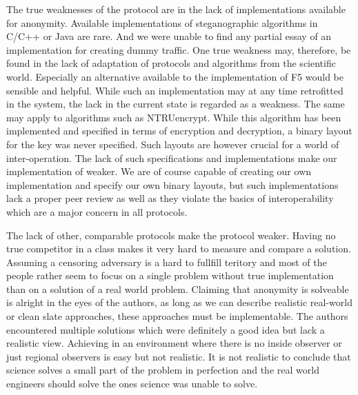 The true weaknesses of the protocol are in the lack of implementations available for anonymity. Available implementations of steganographic algorithms in C/C++ or Java are rare. And we were unable to find any partial essay of an implementation for creating dummy traffic. One true weakness may, therefore, be found in the lack of adaptation of protocols and algorithms from the scientific world. Especially an alternative available to the implementation of F5 would be sensible and helpful. While such an implementation may at any time retrofitted in the system, the lack in the current state is regarded as a weakness. The same may apply to algorithms such as NTRUencrypt. While this algorithm has been implemented and specified in terms of encryption and decryption, a binary layout for the key was never specified. Such layouts are however crucial for a world of inter-operation. The lack of such specifications and implementations make our implementation of \MessageVortex{} weaker. We are of course capable of creating our own implementation and specify our own binary layouts, but such implementations lack a proper peer review as well as they violate the basics of interoperability which are a major concern in all protocols. 

The lack of other, comparable protocols make the \MessageVortex{} protocol weaker. Having no true competitor in a class makes it very hard to measure and compare a solution. Assuming a censoring adversary is a hard to fullfill teritory and most of the people rather seem to focus on a single problem without true implementation than on a solution of a real world problem. Claiming that anonymity is solveable is alright in the eyes of the authors, as long as we can describe realistic real-world or clean slate approaches, these approaches must be implementable. The authors encountered multiple solutions which were definitely a good idea but lack a realistic view. Achieving in an environment where there is no inside observer or just regional observers is easy but not realistic. It is not realistic to conclude that science solves a small part of the problem in perfection and the real world engineers should solve the ones science was unable to solve.

